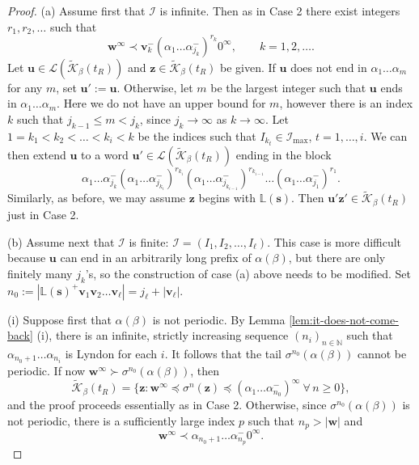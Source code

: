 \documentclass[11pt]{amsart}
\theoremstyle{definition}
\theoremstyle{remark}
\numberwithin{equation}{section}
\newcommand{\N}{\ensuremath{\mathbb{N}}}
\renewcommand{\L}{\ensuremath{\mathbb{L}}}
\newcommand{\II}{\mathcal{I}}
\newcommand{\Kt}{\widetilde{\mathcal{K}}}
\newcommand{\s}{ {\mathbf{s}}}
\newcommand{\cL}{\mathcal{L}}
\renewcommand{\u}{\mathbf{u}}
\renewcommand{\v}{\mathbf{v}}
\newcommand{\w}{\mathbf{w}}
\newcommand{\z}{\mathbf{z}}
\newcommand{\f}{\infty}
\newcommand{\al}{\alpha}
\newcommand{\lle}{\preccurlyeq}
\newcommand{\si}{\sigma}
\begin{document}
\begin{proof}
(a) Assume first that $\II$ is infinite. Then as in Case 2 there exist integers $r_1,r_2,\dots$ such that
\[
\w^\f\prec \v_k^-(\al_1\dots\al_{j_k}^-)^{r_k} 0^\f, \qquad k=1,2,\dots.
\]
Let $\u\in\cL(\Kt_\beta(t_R))$ and $\z\in\Kt_\beta(t_R)$ be given.
If $\u$ does not end in $\al_1\dots\al_m$ for any $m$, set $\u':=\u$. Otherwise, let $m$ be the largest integer such that $\u$ ends in $\al_1\dots\al_m$. Here we do not have an upper bound for $m$, however there is an index $k$ such that $j_{k-1}\leq m<j_{k}$, since $j_k\to\f$ as $k\to\f$. {Let $1=k_1<k_2<\dots<k_i<k$ be the indices such that $I_{k_t}\in\II_{\max}$, $t=1,\dots,i$.} We can then extend $\u$ to a word $\u'\in \cL(\Kt_\beta(t_R))$ ending in the block
\[
\al_1\dots\al_{j_k}^-{(\al_1\dots\al_{j_{k_i}}^-)^{r_{k_i}}(\al_1\dots\al_{j_{k_{i-1}}}^-)^{r_{k_{i-1}}}\dots (\al_1\dots\al_{j_1}^-)^{r_1}}.
\]
Similarly, as before, we may assume $\z$ begins with $\L(\s)$. Then $\u'\z'\in\Kt_\beta(t_R)$ just in Case 2.

(b) Assume next that $\II$ is finite: $\II=(I_1,I_2,\dots,I_\ell)$. This case is more difficult because $\u$ can end in an arbitrarily long prefix of $\al(\beta)$, but there are only finitely many $j_k$'s, so the construction of case (a) above needs to be modified. Set $n_0:=|\L(\s)^+\v_1\v_2\dots\v_{\ell}|=j_{\ell}+|\v_{\ell}|$.

(i) Suppose first that $\al(\beta)$ is not periodic. By Lemma \ref{lem:it-does-not-come-back} (i), there is an infinite, strictly increasing sequence $(n_i)_{n\in\N}$ such that $\al_{n_0+1}\dots\al_{n_i}$ is Lyndon for each $i$. 
It follows that the tail $\si^{n_0}(\al(\beta))$ cannot be periodic. %
If now $\w^\f\succ \si^{n_0}(\al(\beta))$, then
\[
\Kt_\beta(t_R)=\{\z: \w^\f\lle \si^n(\z)\lle (\al_1\dots\al_{n_0}^-)^\f\ \forall\,n\geq 0\},
\]
and the proof proceeds essentially as in Case 2. Otherwise, since $\si^{n_0}(\al(\beta))$ is not periodic, there is a sufficiently large index $p$ such that {$n_p>|\w|$ and}
\begin{equation} \label{eq:finite-cutoff}
\w^\f\prec \al_{n_0+1}\dots \al_{n_{p}}^-0^\f.
\end{equation}


\end{proof}
\end{document}
